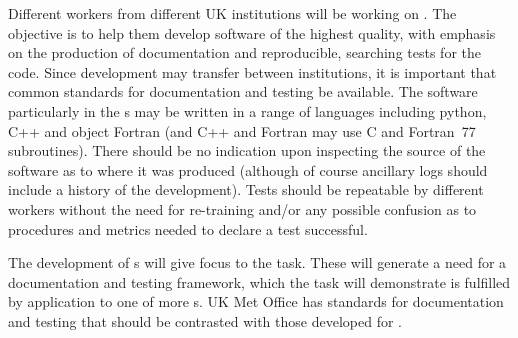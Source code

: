 Different workers from different UK institutions will be working on \nep .
The objective is to help them develop software of the highest quality,
with emphasis on the production of documentation and reproducible,
searching tests for the code.
Since development may transfer between institutions, it is important
that common standards for documentation and testing be available.
The software particularly in the \papp s may be written in a range
of languages including python, C++ and object Fortran (and C++ and Fortran
may use C and Fortran~77 subroutines).
There should be no indication upon inspecting the source of the software as to where
it was produced (although of course ancillary logs should include a history of
the development). Tests should be repeatable by different workers
without the need for re-training and/or any possible confusion as
to procedures and metrics needed to declare a test successful.

The development of \papp s will give focus to the task. These will 
generate a need for a documentation and testing framework, which the task 
will demonstrate is fulfilled by application to one of more \papp s.
UK Met Office has standards for documentation and testing that
should be contrasted with those developed for \nep .
